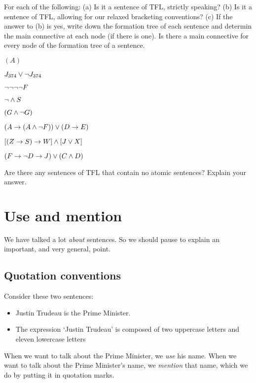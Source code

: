 \begin{practiceproblems}

\solutions
\problempart
\label{pr.wiffTFL}
For each of the following: (a) Is it a sentence of TFL, strictly speaking? (b) Is it a sentence of TFL, allowing for our relaxed bracketing conventions? (c) If the answer to (b) is yes, write down the formation tree of each sentence and determin the main connective at each node (if there is one). Is there a main connective for every node of the formation tree of a sentence.
\begin{earg}
\item $(A)$\hfill {}
\item $J_{374} \vee \neg J_{374}$\hfill {}
\item $\neg \neg \neg \neg F$\hfill {}
\item $\neg \mathbin{\wedge} S$\hfill {}
\item $(G \mathbin{\wedge} \neg G)$\hfill {}
\item $(A \rightarrow (A \mathbin{\wedge} \neg F)) \vee (D \rightarrow E)$\hfill {}
\item $[(Z \rightarrow S) \rightarrow W] \mathbin{\wedge} [J \vee X]$\hfill {}
\item $(F \rightarrow \neg D \rightarrow J) \vee (C \mathbin{\wedge} D)$\hfill {}
\end{earg}

\problempart
Are there any sentences of TFL that contain no atomic sentences? Explain your answer.
\\

\end{practiceproblems}


\chapter{Use and mention}\label{s:UseMention}
We have talked a lot \emph{about} sentences. So we should pause to explain an important, and very general, point.

\section{Quotation conventions}
Consider these two sentences:
	\begin{itemize}
		\item Justin Trudeau is the Prime Minister.
		\item The expression `Justin Trudeau' is composed of two uppercase letters and eleven lowercase letters
	\end{itemize}
When we want to talk about the Prime Minister, we \emph{use} his name. When we want to talk about the Prime Minister's name, we \emph{mention} that name, which we do by putting it in quotation marks.

